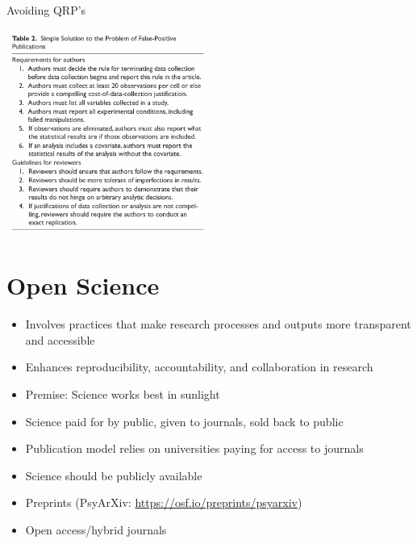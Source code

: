 \documentclass[
  ignorenonframetext,
  aspectratio=169,
]{beamer}
\providecommand{\tightlist}{%
  \setlength{\itemsep}{0pt}\setlength{\parskip}{0pt}}\usepackage{longtable,booktabs,array}
\begin{document}
\begin{frame}{Avoiding QRP's}
\label{avoiding-qrps}
\begin{center}
\includegraphics[width=0.5\textwidth,height=\textheight]{figs/avoid-qrp.png}
\end{center}
\end{frame}

\section{Open Science}\label{open-science}

\begin{frame}{}
\label{section}
\begin{itemize}[<+->]
\tightlist
\item
  Involves practices that make research processes and outputs more
  transparent and accessible
\item
  Enhances reproducibility, accountability, and collaboration in
  research
\item
  Premise: Science works best in sunlight
\item
  Science paid for by public, given to journals, sold back to public
\item
  Publication model relies on universities paying for access to journals
\item
  Science should be publicly available
\item
  Preprints (PsyArXiv: \url{https://osf.io/preprints/psyarxiv})
\item
  Open access/hybrid journals
\end{itemize}
\end{frame}
\end{document}
